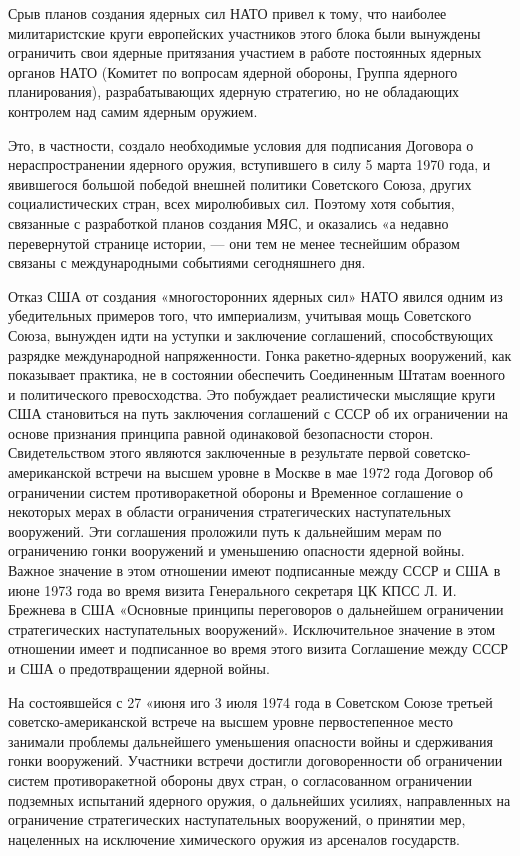 \documentclass[12pt, a4paper, openany]{book}
\begin{document}
Срыв планов создания ядерных сил НАТО привел к тому, что наиболее милитаристские круги европейских участников этого блока были вынуждены ограничить свои ядерные притязания участием в работе постоянных ядерных органов НАТО (Комитет по вопросам ядерной обороны, Группа ядерного планирования), разрабатывающих ядерную стратегию, но не обладающих контролем над самим ядерным оружием.

Это, в частности, создало необходимые условия для подписания Договора о нераспространении ядерного оружия, вступившего в силу 5 марта 1970 года, и явившегося большой победой внешней политики Советского Союза, других социалистических стран, всех миролюбивых сил. Поэтому хотя события, связанные с разработкой планов создания МЯС, и оказались «а недавно перевернутой странице истории, — они тем не менее теснейшим образом связаны с международными событиями сегодняшнего дня.

Отказ США от создания «многосторонних ядерных сил» НАТО явился одним из убедительных примеров того, что империализм, учитывая мощь Советского Союза, вынужден идти на уступки и заключение соглашений, способствующих разрядке международной напряженности. Гонка ракетно-ядерных вооружений, как показывает практика, не в состоянии обеспечить Соединенным Штатам военного и политического превосходства. Это побуждает реалистически мыслящие круги США становиться на путь заключения соглашений с СССР об их ограничении на основе признания принципа равной одинаковой безопасности сторон. Свидетельством этого являются заключенные в результате первой советско-американской встречи на высшем уровне в Москве в мае 1972 года Договор об ограничении систем противоракетной обороны и Временное соглашение о некоторых мерах в области ограничения стратегических наступательных вооружений. Эти соглашения проложили путь к дальнейшим мерам по ограничению гонки вооружений и уменьшению опасности ядерной войны. Важное значение в этом отношении имеют подписанные между СССР и США в июне 1973 года во время визита Генерального секретаря ЦК КПСС Л. И. Брежнева в США «Основные принципы переговоров о дальнейшем ограничении стратегических наступательных вооружений». Исключительное значение в этом отношении имеет и подписанное во время этого визита Соглашение между СССР и США о предотвращении ядерной войны.

На состоявшейся с 27 «июня иго 3 июля 1974 года в Советском Союзе третьей советско-американской встрече на высшем уровне первостепенное место занимали проблемы дальнейшего уменьшения опасности войны и сдерживания гонки вооружений. Участники встречи достигли договоренности об ограничении систем противоракетной обороны двух стран, о согласованном ограничении подземных испытаний ядерного оружия, о дальнейших усилиях, направленных на ограничение стратегических наступательных вооружений, о принятии мер, нацеленных на исключение химического оружия из арсеналов государств.
\end{document}
